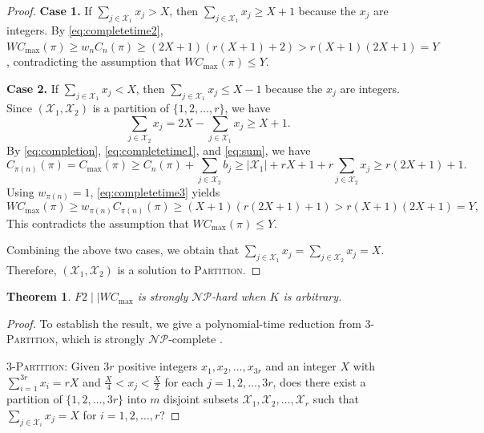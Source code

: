 \documentclass[12pt]{article}
\newtheorem{theorem}{Theorem}[section]
\begin{document}
\begin{sloppypar}
\begin{proof}
            \textbf{Case 1.} If $\sum_{j \in \mathcal{X}_1} x_j > X$, then $\sum_{j \in \mathcal{X}_1} x_j \geq X+1$ because the $x_j$ are integers. By \cref{eq:completetime2}, $W C_{\max}(\pi) \geq w_n C_n(\pi) \geq (2X+1) (r(X+1)+2) >r(X+1)(2X+1)=Y$, contradicting the assumption that $W C_{\max}(\pi) \leq Y$.  
            
            \textbf{Case 2.} If $\sum_{j \in \mathcal{X}_1} x_j < X$, then $\sum_{j \in \mathcal{X}_1} x_j \leq X-1$ because the $x_j$ are integers. Since $(\mathcal{X}_1, \mathcal{X}_2)$ is a partition of $\{1, 2, \ldots, r\}$, we have 
            \begin{equation} \label{eq:sum}
                \sum_{j \in \mathcal{X}_2} x_j =2X-\sum_{j \in \mathcal{X}_1} x_j \geq X+1.
            \end{equation} 
            By \cref{eq:completion}, \cref{eq:completetime1}, and \cref{eq:sum}, we have 
            \begin{equation}\label{eq:completetime3}
                C_{\pi(n)}(\pi)=C_{\max}(\pi) \geq C_n(\pi)+\sum_{j \in \mathcal{X}_2} b_j \geq |\mathcal{X}_1| +r X + 1+ r \sum_{j \in \mathcal{X}_2} x_j \geq r (2X + 1)+1.
            \end{equation}
            Using $w_{\pi(n)}=1$, \cref{eq:completetime3} yields
            \begin{equation*}
                W C_{\max}(\pi) \geq w_{\pi(n)} C_{\pi(n)}(\pi) \geq (X+1) (r(2X+1)+1) >r(X+1)(2X+1)=Y,
            \end{equation*} 
            This contradicts the assumption that $W C_{\max}(\pi) \leq Y$. 
            
            Combining the above two cases, we obtain that $\sum_{j \in \mathcal{X}_1} x_j = \sum_{j \in \mathcal{X}_2} x_j= X$. Therefore, $(\mathcal{X}_1, \mathcal{X}_2)$ is a solution to \textsc{Partition}.       
        \end{proof}
        
        \begin{theorem}\label{thm:snphard}
            $F2 \mid \mid W C_{\max}$ is strongly $\mathcal{NP}$-hard when $K$ is arbitrary.
        \end{theorem}
        \begin{proof}
            To establish the result, we give a polynomial-time reduction from 3-\textsc{Partition}, which is strongly  $\mathcal{NP}$-complete \citep{GareyJohnson1979computer}.
            
            3-\textsc{Partition}: Given $3r$ positive integers $x_1, x_2, \ldots, x_{3r}$ and an integer $X$ with
            $\sum_{i=1}^{3r}x_i=rX$ and $\frac{X}{4} < x_j < \frac{X}{2}$ for each $j=1, 2, \ldots, 3r$, does there exist a partition of $\{1, 2, \ldots, 3r\}$ into $m$ disjoint subsets $\mathcal{X}_1, \mathcal{X}_2, \ldots, \mathcal{X}_r$ such that $\sum_{j \in \mathcal{X}_i} x_j=X$ for $i=1, 2, \ldots, r$?
            

\end{proof}
\end{sloppypar}
\end{document}

